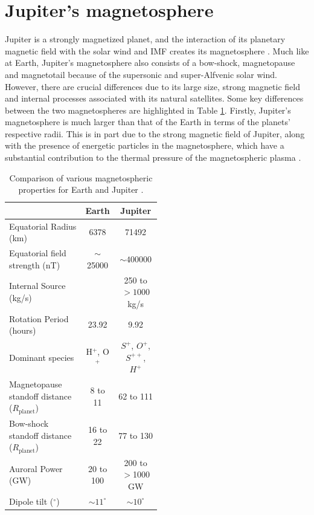 \section{Jupiter's magnetosphere}

Jupiter is a strongly magnetized planet, and the interaction of its planetary magnetic field with the solar wind and IMF creates its magnetosphere \cite{Krupp2004DynamicsMagnetosphere}. Much like at Earth, Jupiter's magnetosphere also consists of a bow-shock, magnetopause and magnetotail because of the supersonic and super-Alfvenic solar wind. However, there are crucial differences due to its large size, strong magnetic field and internal processes associated with its natural satellites. Some key differences between the two magnetospheres are highlighted in Table \ref{tab:earth-jupiter-scales}. Firstly, Jupiter's magnetosphere is much larger than that of the Earth in terms of the planets' respective radii. This is in part due to the strong magnetic field of Jupiter, along with the presence of energetic particles in the magnetosphere, which have a substantial contribution to the thermal pressure of the magnetospheric plasma \cite{Bagenal2011b}. 

\begin{table}
    \centering
    \begin{tabular}{p{0.5\linewidth}|c|c}
        &\textbf{Earth}  &\textbf{Jupiter}\\
    \hline
    Equatorial Radius (km) &6378    &71492\\
    Equatorial field strength (nT)  &$\sim$25000   &$\sim400000$\\
    Internal Source (kg/s)          &   &250 to $>1000$ kg/s\\
    Rotation Period (hours)         &23.92   &9.92\\
    Dominant species                &H$^+$, O$^+$   &$S^+$, $O^+$, $S^{++}$, $H^+$\\
    Magnetopause standoff distance ($R_\text{planet}$)    &8 to 11   &62 to 111\\
    Bow-shock standoff distance ($R_\text{planet}$)   &16 to 22  &77 to 130\\
    Auroral Power (GW)              &20 to 100   &200 to $>$1000 GW \\
    Dipole tilt ($^\circ$)  &$\sim11^\circ$   &$\sim10^\circ$\\
    \end{tabular}
    \caption{Comparison of various magnetospheric properties for Earth and Jupiter \protect\cite{Shue1998MagnetopauseConditions,Cairns1996MagneticShock,Khurana2004a, Krupp2004DynamicsMagnetosphere,Clarke2009}.}
    \label{tab:earth-jupiter-scales}
\end{table}

